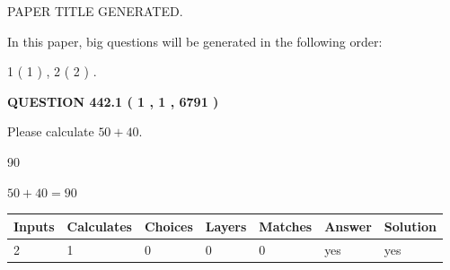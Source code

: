 \documentclass[12pt]{article}
\begin{document}
   
\vspace{0.2in}
   
   
   
   
   
   
   
   
 \vspace{0.2in}
 
 
 
 
   
   
 PAPER TITLE GENERATED.
   
   
   
\vspace{0.2in}
   
In this paper, big questions will be generated in the following order: 
   
   
   1 ( 1 )
 ,
   2 ( 2 )
 .
  
\vspace{0.2in}
  
{\textbf{\Large{QUESTION
442.1 
 ( 1 , 1 , 6791 )
}}}
  
  
 
Please calculate $ %
50 +  %
40 $.
 
 
 
\noindent{}
 
 

90
 
 
\noindent{}
 
 

 
 
 
\noindent{}
 
 

$ %
50 +  %
40=   %
90$
 
 
\noindent{}
 
 

 
   
   
   
   
\noindent\begin{tabular}{|l|l|l|l|l|l|l|}
 \hline
Inputs & Calculates & Choices & Layers & Matches & Answer & Solution \\ \hline
 2  & 
 1  & 
 0
  & 
 0  & 
 0  & 
  yes & 
  yes 
  \\ \hline
 \end{tabular}
   
\end{document}
